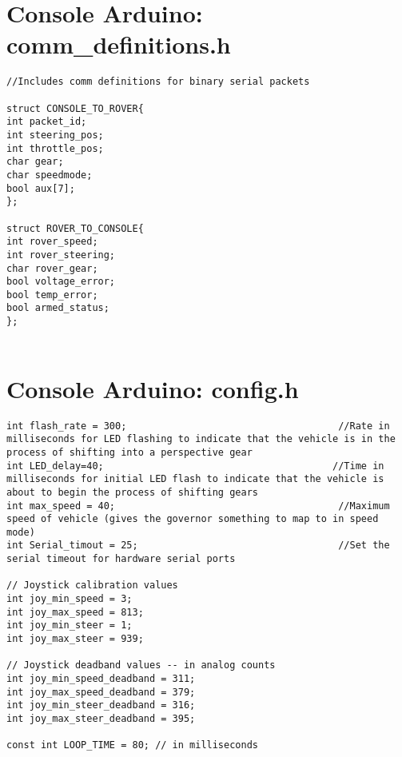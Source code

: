 \section*{Console Arduino: comm\_definitions.h}
\begin{lstlisting}[breaklines=true,basicstyle=\tiny]
//Includes comm definitions for binary serial packets

struct CONSOLE_TO_ROVER{
int packet_id;
int steering_pos;
int throttle_pos;
char gear;
char speedmode;
bool aux[7];
};

struct ROVER_TO_CONSOLE{
int rover_speed;
int rover_steering;
char rover_gear;
bool voltage_error;
bool temp_error; 
bool armed_status;
};


\end{lstlisting}

\section*{Console Arduino: config.h}
\begin{lstlisting}[breaklines=true,basicstyle=\tiny]
int flash_rate = 300;                                     //Rate in milliseconds for LED flashing to indicate that the vehicle is in the process of shifting into a perspective gear
int LED_delay=40;                                        //Time in milliseconds for initial LED flash to indicate that the vehicle is about to begin the process of shifting gears
int max_speed = 40;                                       //Maximum speed of vehicle (gives the governor something to map to in speed mode)
int Serial_timout = 25;                                   //Set the serial timeout for hardware serial ports

// Joystick calibration values
int joy_min_speed = 3;
int joy_max_speed = 813;
int joy_min_steer = 1;
int joy_max_steer = 939;

// Joystick deadband values -- in analog counts 
int joy_min_speed_deadband = 311;
int joy_max_speed_deadband = 379;
int joy_min_steer_deadband = 316;
int joy_max_steer_deadband = 395;

const int LOOP_TIME = 80; // in milliseconds

\end{lstlisting}

